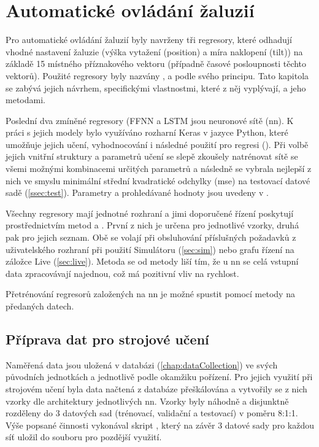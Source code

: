 \chapter{Automatické ovládání žaluzií} \label{chap:regresory}
    Pro automatické ovládání žaluzií byly navrženy tři regresory, které odhadují vhodné nastavení žaluzie (výška vytažení (position) a míra naklopení (tilt)) na základě 15 místného příznakového vektoru (případně časové posloupnosti těchto vektorů). Použité regresory byly nazvány ,  a  podle svého principu. Tato kapitola se zabývá jejich návrhem, specifickými vlastnostmi, které z něj vyplývají, a jeho metodami.
    
    Poslední dva zmíněné regresory (FFNN a LSTM jsou neuronové sítě (\acrshort{nn}). K práci s jejich modely bylo využíváno rozharní Keras v jazyce Python, které umožňuje jejich učení, vyhodnocování i následné použití pro regresi (\cite{keras:doc}). Při volbě jejich vnitřní struktury a parametrů učení se slepě zkoušely natrénovat sítě se všemi možnými kombinacemi určitých parametrů a následně se vybrala nejlepší z nich ve smyslu minimální střední kvadratické odchylky (\acrshort{mse}) na testovací datové sadě (\cref{ssec:test}). Parametry a prohledávané hodnoty jsou uvedeny v .

    Všechny regresory mají jednotné rozhraní a jimi doporučené řízení poskytují prostřednictvím metod  a . První z nich je určena pro jednotlivé vzorky, druhá pak pro jejich seznam. Obě se volají při obsluhování příslušných požadavků z uživatelského rozhraní při použití Simulátoru (\cref{sec:sim}) nebo grafu řízení na záložce Live (\cref{sec:live}). Metoda  se od metody  liší tím, že u \acrshort{nn} se celá vstupní data zpracovávají najednou, což má pozitivní vliv na rychlost. %
    
    Přetrénování regresorů založených na \acrshort{nn} je možné spustit pomocí metody  na předaných datech.

    \section{Příprava dat pro strojové učení} \label{sec:data_prep}
        Naměřená data jsou uložená v databázi (\cref{chap:dataCollection}) ve svých původních jednotkách a jednotlivě podle okamžiku pořízení. Pro jejich využití při strojovém učení byla data načtená z databáze přeškálována a vytvořily se z nich vzorky dle architektury jednotlivých \acrshort{nn}. Vzorky byly náhodně a disjunktně rozděleny do 3 datových sad (trénovací, validační a testovací) v poměru 8:1:1. Výše popsané činnosti vykonával skript , který na závěr 3 datové sady pro každou síť uložil do souboru pro pozdější využití.
        
